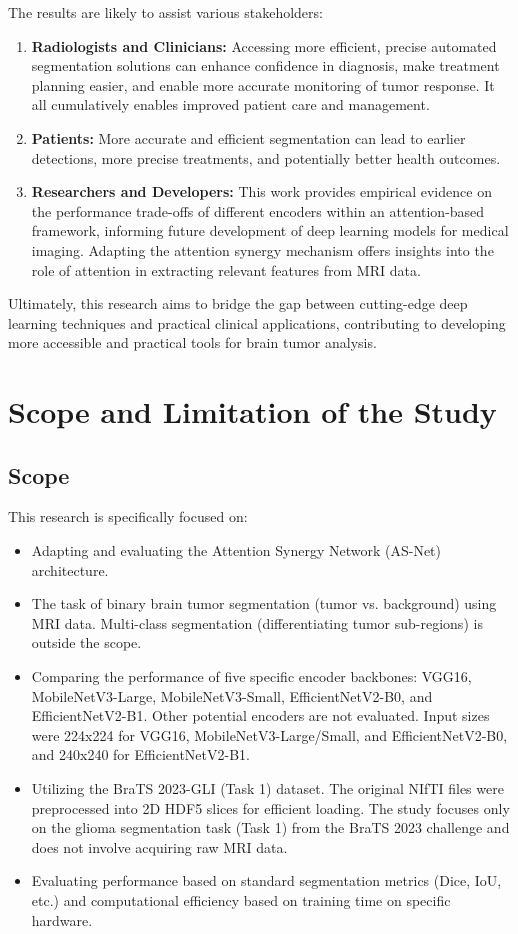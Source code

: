 The results are likely to assist various stakeholders:
\begin{enumerate}
  \item \textbf{Radiologists and Clinicians:} Accessing more efficient, precise automated segmentation solutions can enhance confidence in diagnosis, make treatment planning easier, and enable more accurate monitoring of tumor response. It all cumulatively enables improved patient care and management.
  \item \textbf{Patients:} More accurate and efficient segmentation can lead to earlier detections, more precise treatments, and potentially better health outcomes.
  \item \textbf{Researchers and Developers:} This work provides empirical evidence on the performance trade-offs of different encoders within an attention-based framework, informing future development of deep learning models for medical imaging. Adapting the attention synergy mechanism offers insights into the role of attention in extracting relevant features from MRI data.
\end{enumerate}

Ultimately, this research aims to bridge the gap between cutting-edge deep learning techniques and practical clinical applications, contributing to developing more accessible and practical tools for brain tumor analysis.
\section{Scope and Limitation of the Study}

\subsection{Scope}
This research is specifically focused on:
\begin{itemize}
  \item Adapting and evaluating the Attention Synergy Network (AS-Net) architecture.
  \item The task of binary brain tumor segmentation (tumor vs. background) using MRI data. Multi-class segmentation (differentiating tumor sub-regions) is outside the scope.
  \item Comparing the performance of five specific encoder backbones: VGG16, MobileNetV3-Large, MobileNetV3-Small, EfficientNetV2-B0, and EfficientNetV2-B1. Other potential encoders are not evaluated. Input sizes were 224x224 for VGG16, MobileNetV3-Large/Small, and EfficientNetV2-B0, and 240x240 for EfficientNetV2-B1.
  \item Utilizing the BraTS 2023-GLI (Task 1) dataset. The original NIfTI files were preprocessed into 2D HDF5 slices for efficient loading. The study focuses only on the glioma segmentation task (Task 1) from the BraTS 2023 challenge and does not involve acquiring raw MRI data.
  \item Evaluating performance based on standard segmentation metrics (Dice, IoU, etc.) and computational efficiency based on training time on specific hardware.
\end{itemize}

